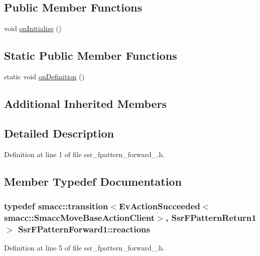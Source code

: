 \subsection*{Public Member Functions}
\begin{DoxyCompactItemize}
\item 
void \hyperlink{structSsrFPatternForward1_a532baa064c9773096c8fd6ce430ac4b3}{on\+Initialize} ()
\end{DoxyCompactItemize}
\subsection*{Static Public Member Functions}
\begin{DoxyCompactItemize}
\item 
static void \hyperlink{structSsrFPatternForward1_ab8a08022167461f22892be52f10bba9c}{on\+Definition} ()
\end{DoxyCompactItemize}
\subsection*{Additional Inherited Members}


\subsection{Detailed Description}


Definition at line 1 of file ssr\+\_\+fpattern\+\_\+forward\+\_.\+h.



\subsection{Member Typedef Documentation}
\subsubsection[{\texorpdfstring{reactions}{reactions}}]{\setlength{\rightskip}{0pt plus 5cm}typedef {\bf smacc\+::transition}$<$Ev\+Action\+Succeeded$<${\bf smacc\+::\+Smacc\+Move\+Base\+Action\+Client}$>$, {\bf Ssr\+F\+Pattern\+Return1}$>$ {\bf Ssr\+F\+Pattern\+Forward1\+::reactions}}\hypertarget{structSsrFPatternForward1_a555853f2c6efa80ab1f5c3aa426876d1}{}\label{structSsrFPatternForward1_a555853f2c6efa80ab1f5c3aa426876d1}


Definition at line 5 of file ssr\+\_\+fpattern\+\_\+forward\+\_.\+h.




